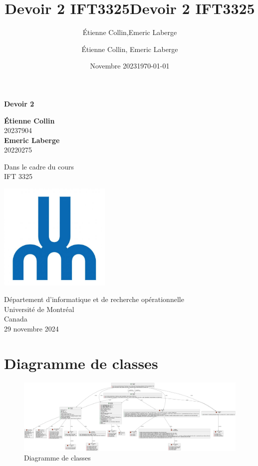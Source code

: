 \documentclass[french]{article}
\title{Devoir 2 IFT3325}
\author{Étienne Collin,Emeric Laberge}
\date{Novembre 2023}
\begin{document}
 \title{Devoir 2 IFT3325}
\author{Étienne Collin, Emeric Laberge}
\date{\today}
\begin{titlepage}
	\begin{center}
		\vspace*{1cm}

		\Huge
		\textbf{Devoir 2}

		\vspace{0.5cm}
		\LARGE

		\vspace{1.5cm}


		\textbf{Étienne Collin}\\ 20237904 \\

		\textbf{Emeric Laberge}\\ 20220275

		\vfill

		Dans le cadre du cours\\
		IFT 3325


		\vspace{0.8cm}

		\includegraphics[width=0.4\textwidth]{./udem.jpg}

		\Large
		Département d'informatique et de recherche opérationnelle\\
		Université de Montréal\\
		Canada\\
		29 novembre 2024

	\end{center}
\end{titlepage} 

\section{Diagramme de classes} 
\begin{figure}[h]
  \centering
  \includegraphics[width=1\textwidth]{../class-diagram/class-diagram.png}
  \caption{Diagramme de classes} 
\end{figure}
\end{document}

